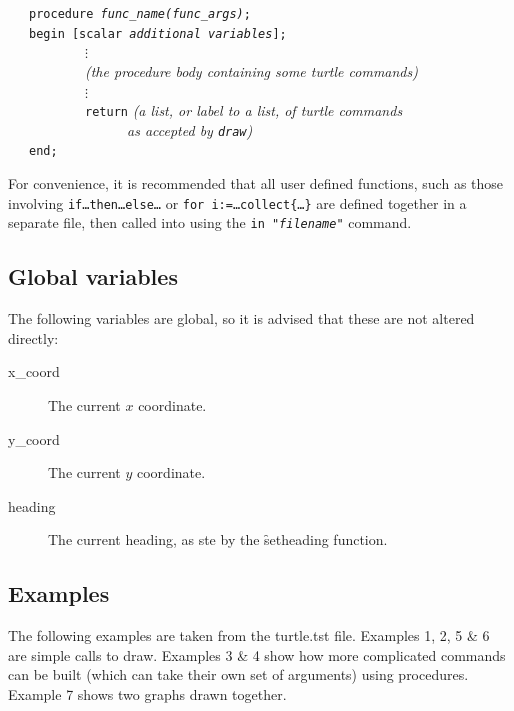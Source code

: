 
\begin{flushleft}
~~~\texttt{procedure \textit{func\_name(func\_args)};}\\
~~~\texttt{begin [scalar \textit{additional variables}];}\\
~~~~~~~~~~~$\vdots$\\
~~~~~~~~~~~\textit{(the procedure body containing some turtle commands)}\\
~~~~~~~~~~~$\vdots$\\
~~~~~~~~~~~\texttt{return} \textit{(a list, or label to a list, of turtle commands}\\
~~~~~~~~~~~~~~~~~\textit{as accepted by \texttt{draw})}\\
~~~\texttt{end;}
\end{flushleft}

  For convenience, it is recommended that all user defined functions, such
as those involving \texttt{if\ldots then\ldots else\ldots} or \texttt{for
i:=\ldots collect\{\ldots\}} are defined together in a separate file, then
called into {\REDUCE} using the \texttt{in "\textit{filename}"} command.

\subsection{Global variables}

The following variables are global, so it is advised that these are not altered directly:
\begin{description}
\item[x\_coord]
  \hypertarget{reserved:X_COORD}{}
  The current $x$ coordinate.
\item[y\_coord]
  \hypertarget{reserved:Y_COORD}{}
  The current $y$ coordinate.
\item[heading]
  \hypertarget{reserved:HEADING}{}
  The current heading, as ste by the \f{setheading} function.
\end{description}

\subsection{Examples}

The following examples are taken from the turtle.tst file.
Examples 1, 2, 5 \& 6 are simple calls to draw. Examples 3 \& 4 show how
more complicated commands can be built (which can take their own set of
arguments) using procedures.
Example 7 shows two graphs drawn together.

